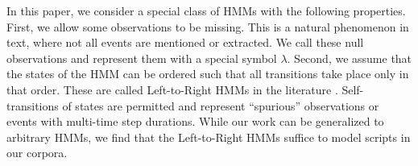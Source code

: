 \documentclass[letterpaper]{article}
\begin{document}
In this paper, we consider a special class of HMMs with the following
properties. %
First, we allow some observations to be missing. This is a natural phenomenon in text, where not all events are mentioned or extracted. We call these null observations and represent them with a special symbol $\lambda$.  Second, we assume that the states of the HMM can be ordered such that all transitions take place only in that order. These are called Left-to-Right HMMs in the literature \cite{rabiner,bahl}. Self-transitions of states are permitted and represent ``spurious'' observations or events with multi-time step durations. While our work can be generalized to arbitrary HMMs, we find that the Left-to-Right HMMs suffice to model scripts in our corpora.  %
\end{document}

